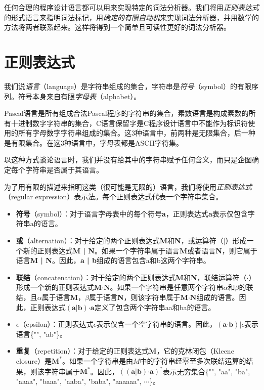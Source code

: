 \documentclass[cn,11pt,chinese]{elegantbook}
\begin{document}
任何合理的程序设计语言都可以用来实现特定的词法分析器。我们将用\textit{正则表达式}的形式语言来指明词法标记，用\textit{确定的有限自动机}来实现词法分析器，并用数学的方法将两者联系起来。这样将得到一个简单且可读性更好的词法分析器。

\section{正则表达式}

我们说\textit{语言}（language）是字符串组成的集合，字符串是\textit{符号}（symbol）的有限序列。符号本身来自有限\textit{字母表}（alphabet）。

Pascal语言是所有组成合法Pascal程序的字符串的集合，素数语言是构成素数的所有十进制数字字符串的集合，C语言保留字是C程序设计语言中不能作为标识符使用的所有字母数字字符串组成的集合。这3种语言中，前两种是无限集合，后一种是有限集合。在这3种语言中，字母表都是ASCII字符集。

以这种方式谈论语言时，我们并没有给其中的字符串赋予任何含义，而只是企图确定每个字符串是否属于其语言。

为了用有限的描述来指明这类（很可能是无限的）语言，我们将使用\textit{正则表达式}（regular expression）表示法。每个正则表达式代表一个字符串集合。

\begin{itemize}
  \item \textbf{符号}（symbol）：对于语言字母表中的每个符号\textbf{a}，正则表达式\textbf{a}表示仅包含字符串a的语言。
  \item \textbf{或}（alternation）：对于给定的两个正则表达式\textbf{M}和\textbf{N}，或运算符（|）形成一个新的正则表达式\textbf{M | N}。如果一个字符串属于语言\textbf{M}或者语言\textbf{N}，则它属于语言\textbf{M | N}。因此，\textbf{a | b}组成的语言包含a和b这两个字符串。
  \item \textbf{联结}（concatenation）：对于给定的两个正则表达式\textbf{M}和\textbf{N}，联结运算符（$\boldsymbol{\cdot}$）形成一个新的正则表达式$\textbf{M}\boldsymbol{\cdot}\textbf{N}$。如果一个字符串是任意两个字符串$\alpha$和$\beta$的联结，且$\alpha$属于语言\textbf{M}，$\beta$属于语言\textbf{N}，则该字符串属于$\textbf{M}\boldsymbol{\cdot}\textbf{N}$组成的语言。因此，正则表达式$(\textbf{a} | \textbf{b})\boldsymbol{\cdot} \textbf{a}$定义了包含两个字符串aa和ba的语言。
  \item $\epsilon$（epsilon）：正则表达式$\epsilon$表示仅含一个空字符串的语言。因此，$(\textbf{a}\boldsymbol{\cdot}\textbf{b})|\epsilon$表示语言\{"", "ab"\}。
  \item \textbf{重复}（repetition）：对于给定的正则表达式\textbf{M}，它的克林闭包（Kleene closure）是$\textbf{M}^*$。如果一个字符串是由$M$中的字符串经零至多次联结运算的结果，则该字符串属于$\textbf{M}^*$。因此，$((\textbf{a}|\textbf{b})\boldsymbol{\cdot}\textbf{a})^*$表示无穷集合\{"", "aa", "ba", "aaaa", "baaa", "aaba", "baba", "aaaaaa", $\cdots$\}。
\end{itemize}
\end{document}
